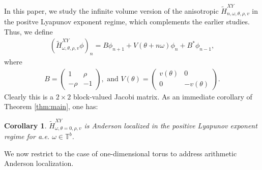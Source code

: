 \documentclass[11pt]{amsart}
\newtheorem{corollary}[theorem]{Corollary}
\newcommand{\T}{\mathbb T}
\begin{document}
In this paper, we study the infinite volume version of the anisotropic $\widetilde{H}_{n,\omega,\theta,\rho,v}^{XY}$ in the positve Lyapunov exponent regime, which complements the earlier studies. Thus, we define 
\begin{align}
(\widetilde{H}^{XY}_{\omega,\theta,\rho,v}\phi)_n=B \phi_{n+1}+V(\theta+n\omega) \phi_n+B^* \phi_{n-1},
\end{align}
where 
\begin{align}
    B=\left(\begin{matrix}1 &\rho\\ -\rho &-1\end{matrix}\right), \text{ and } V(\theta)=\left(\begin{matrix} v(\theta) &0 \\ 0 &-v(\theta)\end{matrix}\right).
\end{align}
Clearly this is a $2\times 2$ block-valued Jacobi matrix. As an immediate corollary of Theorem \ref{thm:main}, one has:
\begin{corollary}\label{cor:thm1_XY}
$\widetilde{H}^{XY}_{\omega,\theta=0,\rho,v}$ is Anderson localized in the positive Lyapunov exponent regime for a.e. $\omega\in \T^b$.
\end{corollary}

We now restrict to the case of one-dimensional torus to address arithmetic Anderson localization.
\end{document}
